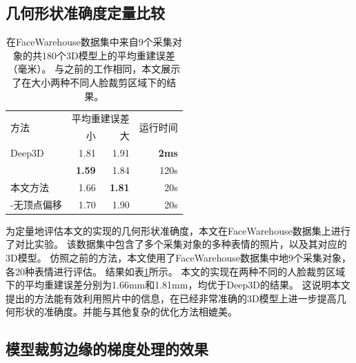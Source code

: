\subsection{几何形状准确度定量比较}

\begin{table}
    \caption[FaceWarehouse数据集上的平均重建误差]{
        在FaceWarehouse数据集中来自9个采集对象的共180个3D模型上的平均重建误差（毫米）。
        与之前的工作相同，本文展示了在大小两种不同人脸裁剪区域下的结果。
    }
    \label{tab:facewarehouse}
    \centering
    \begin{tabular}{l|rrr}
        \toprule
        \multirow{2}{*}{方法} & \multicolumn{2}{c}{平均重建误差} & \multirow{2}{*}{运行时间} \\
        \cmidrule{2-3}
        & 小 & 大 \\
        \midrule
        Deep3D\citep{deep3d} & 1.81 & 1.91 & \textbf{2ms} \\
        \citet{GZCVVPT16} & \textbf{1.59} & 1.84 & 120s \\
        本文方法 & 1.66 & \textbf{1.81} & 20s \\
        \hspace{2ex} -无顶点偏移 & 1.70 & 1.90 & 20s \\
        \bottomrule
    \end{tabular}
\end{table}
为定量地评估本文的实现的几何形状准确度，本文在FaceWarehouse\citep{FaceWarehouse}数据集上进行了对比实验。
该数据集中包含了多个采集对象的多种表情的照片，以及其对应的3D模型。
仿照之前的方法，本文使用了FaceWarehouse数据集中地9个采集对象，各20种表情进行评估。
结果如表\ref{tab:facewarehouse}所示。
本文的实现在两种不同的人脸裁剪区域下的平均重建误差分别为1.66mm和1.81mm，均优于Deep3D的结果。
这说明本文提出的方法能有效利用照片中的信息，在已经非常准确的3D模型上进一步提高几何形状的准确度。并能与其他复杂的优化方法\citep{GZCVVPT16}相媲美。

\subsection{模型裁剪边缘的梯度处理的效果}

